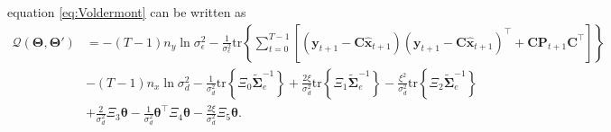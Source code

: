 \documentclass[]{article}
\begin{document}
equation \ref{eq:Voldermont} can be written as
\begin{align}\label{eq:VoldermontwitXivariables}
 \mathcal Q(\boldsymbol \Theta,\boldsymbol\Theta')&=-(T-1)n_y\ln \sigma_{\epsilon}^2-\frac{1}{\sigma_{\epsilon}^2}\mathrm{tr}\left\lbrace\boldsymbol\sum_{t=0}^{T-1}\left[ (\mathbf y_{t+1}-\mathbf C\mathbf{\hat{x}}_{t+1}) (\mathbf y_{t+1}-\mathbf C\mathbf{\hat{x}}_{t+1})^\top+\mathbf C \mathbf P_{t+1}\mathbf C^\top\right] \right\rbrace\nonumber \\
&-(T-1)n_x\ln\sigma_d^2-\frac{1}{\sigma_d^2}\mathrm{tr}\left\lbrace \Xi_{0} \tilde{\boldsymbol\Sigma}_e^{-1}\right\rbrace +\frac{2\xi}{\sigma_d^2} \mathrm{tr}\left\lbrace \Xi_{1} \tilde{\boldsymbol\Sigma}_e^{-1}\right\rbrace -  \frac{\xi^2}{\sigma_d^2}\mathrm{tr} \left\lbrace\Xi_{2}\tilde{\boldsymbol\Sigma}_e^{-1} \right\rbrace 
 \nonumber \\
&+\frac{2}{\sigma_d^2}\Xi_{3}\boldsymbol\theta-\frac{1}{\sigma_d^2}\boldsymbol\theta^\top \Xi_{4}\boldsymbol\theta-\frac{2\xi}{\sigma_d^2} \Xi_{5} \boldsymbol\theta.
\end{align}
\end{document}
